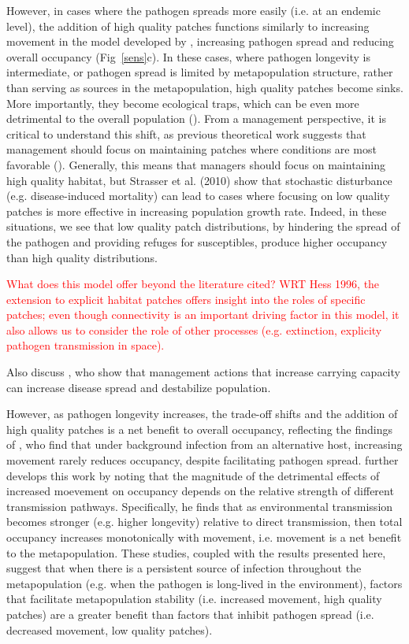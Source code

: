 \documentclass{svjour3}
\begin{document}
However, in cases where the pathogen spreads more easily (i.e. at an endemic level), the addition of high quality patches functions similarly to increasing movement in the model developed by \cite{Hess1996}, increasing pathogen spread and reducing overall occupancy (Fig~\ref{sens}c).  In these cases, where pathogen longevity is intermediate, or pathogen spread is limited by metapopulation structure, rather than serving as sources in the metapopulation, high quality patches become sinks.  More importantly, they become ecological traps, which can be even more detrimental to the overall population (\cite{Kristan2003}).  From a management perspective, it is critical to understand this shift, as previous theoretical work suggests that management should focus on maintaining patches where conditions are most favorable (\cite{Strasser2010}).  Generally, this means that managers should focus on maintaining high quality habitat, but Strasser et al. (2010) show that stochastic disturbance (e.g. disease-induced mortality) can lead to cases where focusing on low quality patches is more effective in increasing population growth rate.  Indeed, in these situations, we see that low quality patch distributions, by hindering the spread of the pathogen and providing refuges for susceptibles, produce higher occupancy than high quality distributions.  

\textcolor{red}{What does this model offer beyond the literature cited?  WRT Hess 1996, the extension to explicit habitat patches offers insight into the roles of specific patches; even though connectivity is an important driving factor in this model, it also allows us to consider the role of other processes (e.g. extinction, explicity pathogen transmission in space).}

Also discuss \cite{Sharp2011}, who show that management actions that increase carrying capacity can increase disease spread and destabilize population.

However, as pathogen longevity increases, the trade-off shifts and the addition of high quality patches is a net benefit to overall occupancy, reflecting the findings of \cite{Gog2002}, who find that under background infection from an alternative host, increasing movement rarely reduces occupancy, despite facilitating pathogen spread.  \cite{Park2012} further develops this work by noting that the magnitude of the detrimental effects of increased moevement on occupancy depends on the relative strength of different transmission pathways.  Specifically, he finds that as environmental transmission becomes stronger (e.g. higher longevity) relative to direct transmission, then total occupancy increases monotonically with movement, i.e. movement is a net benefit to the metapopulation.  These studies, coupled with the results presented here, suggest that when there is a persistent source of infection throughout the metapopulation (e.g. when the pathogen is long-lived in the environment), factors that facilitate metapopulation stability (i.e. increased movement, high quality patches) are a greater benefit than factors that inhibit pathogen spread (i.e. decreased movement, low quality patches). 
\end{document}
